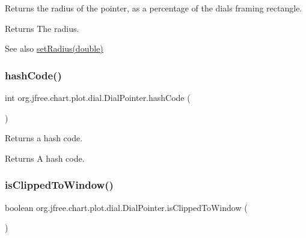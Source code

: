Returns the radius of the pointer, as a percentage of the dial\textquotesingle{}s framing rectangle.

\begin{DoxyReturn}{Returns}
The radius.
\end{DoxyReturn}
\begin{DoxySeeAlso}{See also}
\mbox{\hyperlink{classorg_1_1jfree_1_1chart_1_1plot_1_1dial_1_1_dial_pointer_af2f54d1338e0a0c25ba5ba2c32d0452c}{set\+Radius(double)}} 
\end{DoxySeeAlso}
\mbox{\label{classorg_1_1jfree_1_1chart_1_1plot_1_1dial_1_1_dial_pointer_a9c85ef4935d0ae4f43fe7bed6f237044}} 
\subsubsection{\texorpdfstring{hash\+Code()}{hashCode()}}
{\footnotesize\ttfamily int org.\+jfree.\+chart.\+plot.\+dial.\+Dial\+Pointer.\+hash\+Code (\begin{DoxyParamCaption}{ }\end{DoxyParamCaption})}

Returns a hash code.

\begin{DoxyReturn}{Returns}
A hash code. 
\end{DoxyReturn}
\mbox{\label{classorg_1_1jfree_1_1chart_1_1plot_1_1dial_1_1_dial_pointer_a4b4c8a88080051d443db95941d01dce1}} 
\subsubsection{\texorpdfstring{is\+Clipped\+To\+Window()}{isClippedToWindow()}}
{\footnotesize\ttfamily boolean org.\+jfree.\+chart.\+plot.\+dial.\+Dial\+Pointer.\+is\+Clipped\+To\+Window (\begin{DoxyParamCaption}{ }\end{DoxyParamCaption})}

